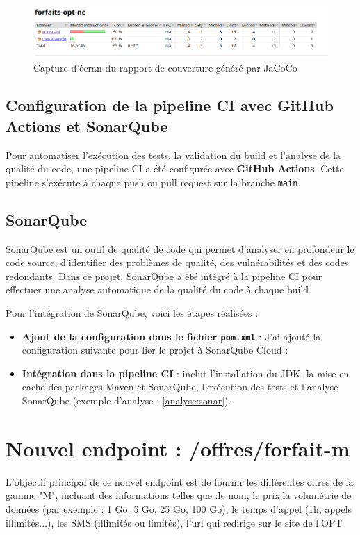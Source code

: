 \documentclass[11pt]{article}
\begin{document}
		\begin{figure}[h!]
			\centering
			\includegraphics[width=\textwidth]{asset/jacoco.png}
			\caption{Capture d'écran du rapport de couverture généré par JaCoCo}
			\label{fig:jacoco-report}
		\end{figure}
		
		\subsection{Configuration de la pipeline CI avec GitHub Actions et SonarQube}
		Pour automatiser l'exécution des tests, la validation du build et l'analyse de la qualité du code, une pipeline CI a été configurée avec \textbf{GitHub Actions}. Cette pipeline s'exécute à chaque push ou pull request sur la branche \texttt{main}.
		
		\subsection{SonarQube}
		SonarQube est un outil de qualité de code qui permet d'analyser en profondeur le code source, d'identifier des problèmes de qualité, des vulnérabilités et des codes redondants. Dans ce projet, SonarQube a été intégré à la pipeline CI pour effectuer une analyse automatique de la qualité du code à chaque build.
		
		Pour l'intégration de SonarQube, voici les étapes réalisées :
		\begin{itemize}
			\item \textbf{Ajout de la configuration dans le fichier \texttt{pom.xml}} : J'ai ajouté la configuration suivante pour lier le projet à SonarQube Cloud :

		
			\item\textbf{Intégration dans la pipeline CI} : inclut l'installation du JDK, la mise en cache des packages Maven et SonarQube, l'exécution des tests et l'analyse SonarQube (exemple d'analyse : \ref{analyse:sonar}).
		\end{itemize}
		\section{Nouvel endpoint : /offres/forfait-m}
		L'objectif principal de ce nouvel endpoint est de fournir les différentes offres de la gamme "M", incluant des informations telles que :le nom, le prix,la volumétrie de données (par exemple : 1 Go, 5 Go, 25 Go, 100 Go), le temps d'appel (1h, appels illimités...), les SMS (illimités ou limités), l'url qui redirige sur le site de l'OPT
	
\end{document}
